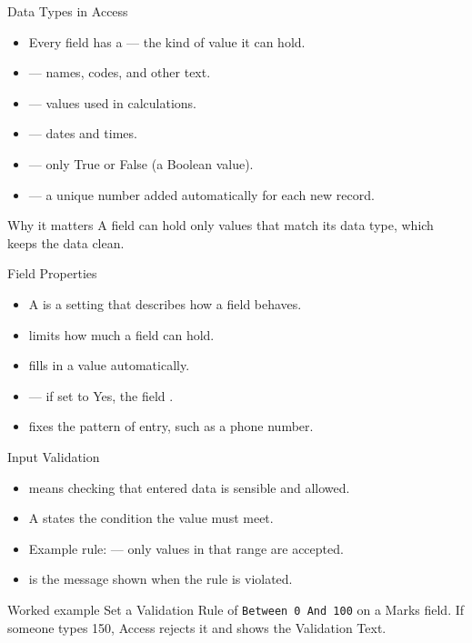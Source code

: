 \documentclass[aspectratio=169]{beamer}
\begin{document}
\begin{frame}{Data Types in Access}
  \begin{itemize}
    \item Every field has a  --- the kind of value it can
      hold.
    \item {} --- names, codes, and other text.
    \item {} --- values used in calculations.
    \item {} --- dates and times.
    \item {} --- only True or False (a Boolean value).
    \item {} --- a unique number added automatically for each
      new record.
  \end{itemize}
  \begin{block}{Why it matters}
    A field can hold only values that match its data type, which keeps the
    data clean.
  \end{block}
\end{frame}

\begin{frame}{Field Properties}
  \begin{itemize}
    \item A  is a setting that describes how a field
      behaves.
    \item {} limits how much a field can hold.
    \item {} fills in a value automatically.
    \item {} --- if set to Yes, the field .
    \item {} fixes the pattern of entry, such as a phone
      number.
  \end{itemize}
\end{frame}

\begin{frame}{Input Validation}
  \begin{itemize}
    \item {} means checking that entered data is sensible and
      allowed.
    \item A  states the condition the value must meet.
    \item Example rule:  --- only values in that range
      are accepted.
    \item {} is the message shown when the rule is
      violated.
  \end{itemize}
  \begin{exampleblock}{Worked example}
    Set a Validation Rule of \texttt{Between 0 And 100} on a Marks field.
    If someone types 150, Access rejects it and shows the Validation Text.
  \end{exampleblock}
\end{frame}
\end{document}
